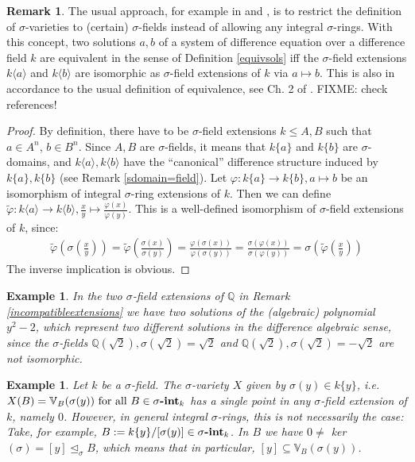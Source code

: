 \documentclass{article}
\def\Q{\mathbb{Q}}
\def\VV{\mathbb{V}}
\def\s{\sigma}
\def\si{\unlhd_{\sigma}}
\def\fa{\text{ for all }}
\newcommand{\catname}[1]{{\normalfont\textbf{#1}}}
\newcommand{\sintk}{\s\text{\catname{-int}}_k}
\newenvironment{bew}{\begin{proof}[Proof]}{\end{proof}}
\theoremstyle{plain}
\newtheorem{ex}[Satz]{Example}
\theoremstyle{definition}
\newtheorem{rem}[Satz]{Remark}
\begin{document}
\begin{rem}
The usual approach, for example in \cite{cohn} and \cite{levin}, is to restrict the definition of $\s$-varieties to (certain) $\s$-fields instead of allowing any integral $\s$-rings. With this concept,
two solutions $a,b$ of a system of difference equation over a difference field $k$ are equivalent in the sense of Definition \ref{equivsols} iff the $\s$-field extensions $k\langle a \rangle$ and $k\langle b \rangle$ are isomorphic as $\s$-field extensions of $k$ via $a \mapsto b$.
This is also in accordance to the usual definition of equivalence, see Ch. 2 of \cite{wibmer}. FIXME: check references!
\begin{bew}
By definition, there have to be $\s$-field extensions $k \leq A,B$ such that $a \in A^n$, $b \in B^n$. Since $A,B$ are $\s$-fields, it means that $k\{a\}$ and $k\{b\}$ are $\s$-domains, 
and $k\langle a \rangle, k\langle b \rangle$ have the ``canonical'' difference structure induced by $k\{a\}, k\{b\}$ (see Remark \ref{sdomain=field}). Let $\varphi: k\{a\} \rightarrow k\{b\}, a \mapsto b$ be an isomorphism of integral $\s$-ring extensions of $k$.
Then we can define $\tilde \varphi: k \langle a \rangle \rightarrow k\langle b \rangle, \frac{x}{y} \mapsto \frac{\varphi(x)}{\varphi{(y)}}$. This is a well-defined isomorphism of $\s$-field extensions of $k$, since:
\begin{align*}
\tilde \varphi \left(\s \left(\frac{x}{y}\right)\right) = \tilde \varphi \left( \frac{\s \left(x\right)}{\s \left(y\right)}\right) = \frac{ \varphi \left(\s \left(x\right)\right)}{ \varphi \left(\s \left(y\right)\right)} =  \frac{\s \left(\varphi \left(x\right)\right)}{\s \left(\varphi \left(y\right)\right)} = \s \left( \tilde \varphi \left(\frac{x}{y}\right)\right)
\end{align*}
The inverse implication is obvious.
\end{bew}
\end{rem}

\begin{ex}
In the two $\s$-field extensions of $\Q$ in Remark \ref{incompatibleextensions} we have two solutions of the (algebraic) polynomial $y^2-2$, which represent two different solutions in the difference algebraic sense,
since the $\s$-fields $\Q(\sqrt{2}), \s(\sqrt{2}) = \sqrt{2}$ and $\Q(\sqrt{2}), \s(\sqrt{2}) = -\sqrt{2}$ are not isomorphic. 
\end{ex}

\begin{ex}
Let $k$ be a $\s$-field. The $\s$-variety $X$ given by $\s(y) \in k\{y\}$, i.e. $X(B) = \VV_B(\s(y)) \fa B \in \sintk$ has a single point in any $\s$-field extension of $k$, namely $0$. However, in general integral $\s$-rings,
this is not necessarily the case: Take, for example, $B:= k\{y\}/[\s(y)] \in \sintk$. In $B$ we have $0 \neq $ ker$(\s) = [y] \si B$, which means that in particular, $[y] \subseteq \VV_B(\s(y))$.
\end{ex}
\end{document}
